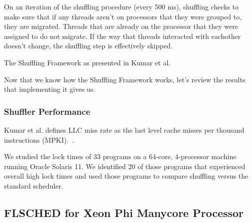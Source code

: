 \documentclass{sig-alternate}
\begin{document}
On an iteration of the shuffling procedure (every 500 ms), shuffling checks to make sure that if any threads aren't on processors that they were grouped to, they are migrated. Threads that are already on the processor that they were assigned to do not migrate. If the way that threads interacted with eachother doesn't change, the shuffling step is effectively skipped.~\cite{KumarEtal:2014}

\begin{algorithm}


	\caption{The Shuffling Framework
	as presented in Kumar et al.~\cite{KumarEtal:2014}}\label{euclid}\label{alg:shuffler}
\end{algorithm}

Now that we know how the Shuffling Framework works, let's review the results that implementing it gives us.

\subsubsection{Shuffler Performance}
\label{sec:shuf_performance}

Kumar et al. defines LLC miss rate as the last level cache misses per thousand instructions (MPKI).~\cite{KumarEtal:2014}.

We studied the lock times of 33 programs on a 64-core, 4-processor machine running Oracle Solaris 11. We identified 20 of those programs that experienced overall high lock times and used those programs to compare shuffling versus the standard scheduler.~\cite{KumarEtal:2014}



\subsection{FLSCHED for Xeon Phi Manycore Processor}
\label{sec:flsched}
\end{document}
